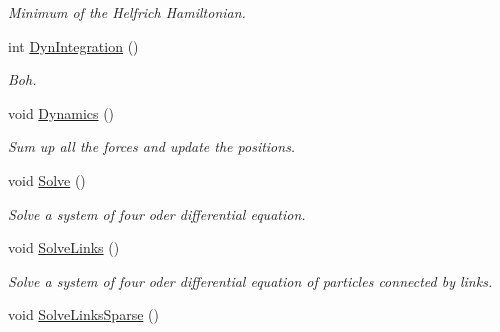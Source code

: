 \begin{DoxyCompactItemize}
\begin{DoxyCompactList}\small\item\em \-Minimum of the \-Helfrich \-Hamiltonian. \end{DoxyCompactList}\item 
\hypertarget{classForces_affd222b3ce256a0c538341cc4d81865e}{int \hyperlink{classForces_affd222b3ce256a0c538341cc4d81865e}{\-Dyn\-Integration} ()}\label{classForces_affd222b3ce256a0c538341cc4d81865e}

\begin{DoxyCompactList}\small\item\em \-Boh. \end{DoxyCompactList}\item 
\hypertarget{classForces_a338adbdaecf3f72150ce3e88ec710bf1}{void \hyperlink{classForces_a338adbdaecf3f72150ce3e88ec710bf1}{\-Dynamics} ()}\label{classForces_a338adbdaecf3f72150ce3e88ec710bf1}

\begin{DoxyCompactList}\small\item\em \-Sum up all the forces and update the positions. \end{DoxyCompactList}\item 
void \hyperlink{classForces_a941bab4d0655ea3e774cd525e664be52}{\-Solve} ()
\begin{DoxyCompactList}\small\item\em \-Solve a system of four oder differential equation. \end{DoxyCompactList}\item 
void \hyperlink{classForces_ac6b917be683f5ceaeec62edbf9472511}{\-Solve\-Links} ()
\begin{DoxyCompactList}\small\item\em \-Solve a system of four oder differential equation of particles connected by links. \end{DoxyCompactList}\item 
\hypertarget{classForces_a35266508f74e6ca08000446ebbd62fc6}{void \hyperlink{classForces_a35266508f74e6ca08000446ebbd62fc6}{\-Solve\-Links\-Sparse} ()}\label{classForces_a35266508f74e6ca08000446ebbd62fc6}


\end{DoxyCompactItemize}
